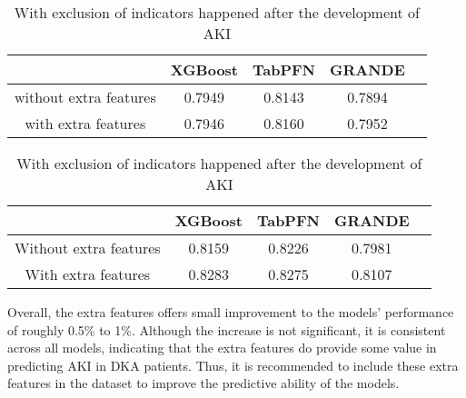 \documentclass[../main.tex]{subfiles}
\begin{document}
\begin{table}[H]
    \centering
    \caption{AUC-ROC of tabular-based models with and without extra features}
    \label{tab:extra-features}

    \begin{subtable}{\textwidth}
        \centering
        \caption{Without exclusion of indicators happened after the development of AKI}
        \label{tab:extra-features-no-exclusion}
        \begin{tabular}{|c|c|c|c|c|}
            \hline
            \textbf{} & 
            \textbf{XGBoost} & 
            \textbf{TabPFN} & 
            \textbf{GRANDE} \\
            \hline

            without extra features & 
            0.7949 & 
            0.8143 & 
            0.7894 \\

            with extra features & 
            0.7946 & 
            0.8160 & 
            0.7952 \\

            \hline
        \end{tabular}
    \end{subtable}
    
    \vspace{1cm}

    \begin{subtable}{\textwidth}
        \centering
        \caption{With exclusion of indicators happened after the development of AKI}
        \label{tab:extra-features-exclusion}
        \begin{tabular}{|c|c|c|c|c|}
            \hline
            \textbf{} & 
            \textbf{XGBoost} & 
            \textbf{TabPFN} & 
            \textbf{GRANDE} \\
            \hline

            Without extra features & 
            0.8159 & 
            0.8226 & 
            0.7981 \\

            With extra features & 
            0.8283 & 
            0.8275 & 
            0.8107 \\

            \hline
        \end{tabular}
    \end{subtable}

\end{table}

Overall, the extra features offers small improvement to the models' performance of roughly 0.5\% to 1\%.
Although the increase is not significant, it is consistent across all models, indicating that the extra features do provide some value in predicting \gls{AKI} in \gls{DKA} patients.
Thus, it is recommended to include these extra features in the dataset to improve the predictive ability of the models.
\end{document}

